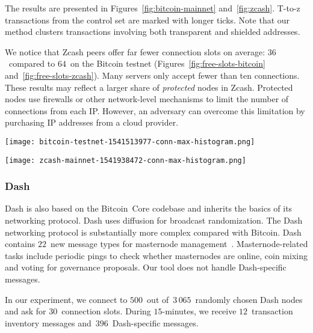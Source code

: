 The results are presented in Figures~\ref{fig:bitcoin-mainnet} and~\ref{fig:zcash}.
T-to-z transactions from the control set are marked with longer ticks.
Note that our method clusters transactions involving both transparent and shielded addresses.

We notice that Zcash peers offer far fewer connection slots on average: $36$~compared to $64$~on the Bitcoin testnet (Figures~\ref{fig:free-slots-bitcoin} and~\ref{fig:free-slots-zcash}).
Many servers only accept fewer than ten connections.
These results may reflect a larger share of \textit{protected} nodes in Zcash.
Protected nodes use firewalls or other network-level mechanisms to limit the number of connections from each IP\@.
However, an adversary can overcome this limitation by purchasing IP addresses from a cloud provider.

\begin{figure*}
	\centering
	\begin{minipage}{0.5\textwidth}
		\centering
		\texttt{[image: bitcoin-testnet-1541513977-conn-max-histogram.png]}
		\caption{Free connection slots for Bitcoin testnet.}
		\label{fig:free-slots-bitcoin}
	\end{minipage}\hfill
	\begin{minipage}{0.5\textwidth}
		\centering
		\texttt{[image: zcash-mainnet-1541938472-conn-max-histogram.png]}
		\caption{Free connection slots for Zcash mainnet.}
		\label{fig:free-slots-zcash}
	\end{minipage}\hfill
\end{figure*}


\subsubsection{Dash}

Dash is also based on the Bitcoin~Core codebase and inherits the basics of its networking protocol.
Dash uses diffusion for broadcast randomization.
The Dash networking protocol is substantially more complex compared with Bitcoin.
Dash contains $22$~new message types for masternode management~\cite{Schinzel2015}.
Masternode-related tasks include periodic pings to check whether masternodes are online, coin mixing and voting for governance proposals.
Our tool does not handle Dash-specific messages.

In our experiment, we connect to $500$~out of~$3\,065$~randomly chosen Dash nodes and ask for $30$~connection slots.
During $15$-minutes, we receive $12$~transaction inventory messages and~$396$~Dash-specific messages.

